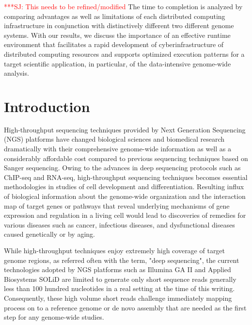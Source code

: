 \documentclass[12pt]{article}
\newcommand{\jhanote}[1]{ {\textcolor{red}     {***SJ: #1}}}
\newcommand{\jhanote}[1]{}
\begin{document}


\jhanote{This needs to be refined/modified} The time to completion is analyzed by comparing advantages as well as limitations of each distributed computing infrastructure in conjunction with distinctively different two different genome systems.  With our results, we discuss the importance of an effective runtime environment that facilitates a rapid development of cyberinfrastructure of distributed computing resources and supports optimized execution patterns for a target scientific application, in particular, of the data-intensive genome-wide analysis.


\section{Introduction}

% 
% 
High-throughput sequencing techniques provided by Next Generation Sequencing (NGS) platforms have changed biological
sciences and biomedical research dramatically with their comprehensive genome-wide
information as well as a considerably affordable cost compared to previous sequencing techniques based on Sanger sequencing\cite{metzker2010,mardis2008-tig,mardis2008-arghg,gilad2009,mortazavi2008,sorek2010}.  
Owing to the advances in deep sequencing protocols such as ChIP-seq and RNA-seq, high-throughput sequencing techniques becomes essential methodologies in studies of cell development and differentiation\cite{wang2009-natrevgen,pepke2009,gilad2009,mortazavi2008,sorek2010}.   Resulting influx of biological information about the genome-wide organization and the interaction map of target genes or pathways that reveal underlying mechanisms of gene expression and regulation in a living cell would lead to discoveries of remedies for various diseases such as cancer, infectious diseases, and dysfunctional diseases caused genetically or by aging\cite{amaral2008,encode2007,baek2008,costa2009,}.    

While high-throughput techniques enjoy extremely high coverage of target genome regions, as referred often with the term, "deep sequencing", the current technologies adopted by NGS platforms such as Illumina GA II and Applied Biosystems SOLiD are limited to generate only short sequence reads generally less than 100 hundred nucleotides in a real setting at the time of this writing\cite{metzker2010}.  Consequently, these high volume short reads challenge immediately mapping process on to a reference genome or de novo assembly that are  needed as the first step for any genome-wide studies\cite{alex2009,trapnell2009,scheibye-alsing2009,pop2002,hernandez2008,farrer2008}.      
\end{document}

